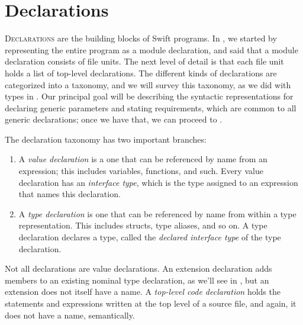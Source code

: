 \documentclass[../generics]{subfiles}
\begin{document}
\chapter{Declarations}\label{decls}

\lettrine{D}{eclarations} are the building blocks of Swift programs. In , we started by representing the entire program as a module declaration, and said that a module declaration consists of file units. The next level of detail is that each file unit holds a list of top-level declarations. The different kinds of declarations are categorized into a taxonomy, and we will survey this taxonomy, as we did with types in . Our principal goal will be describing the syntactic representations for declaring generic parameters and stating requirements, which are common to all generic declarations; once we have that, we can proceed to .

The declaration taxonomy has two important branches:
\begin{enumerate}
\item A \emph{value declaration} is a one that can be referenced by name from an expression; this includes variables, functions, and such. Every value declaration has an \emph{interface type}, which is the type assigned to an expression that names this declaration.
\item A \emph{type declaration} is one that can be referenced by name from within a type representation. This includes structs, type aliases, and so on. A type declaration declares a type, called the \emph{declared interface type} of the type declaration.
\end{enumerate}
Not all declarations are value declarations. An extension declaration adds members to an existing nominal type declaration, as we'll see in , but an extension does not itself have a name. A \emph{top-level code declaration} holds the statements and expressions written at the top level of a source file, and again, it does not have a name, semantically.
\end{document}
